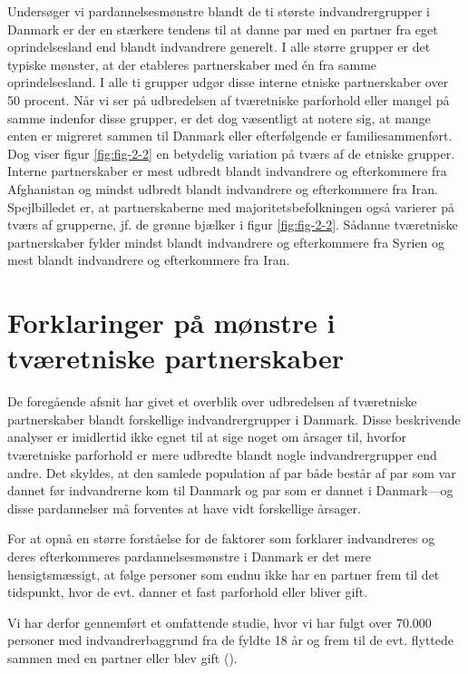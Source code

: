 \documentclass[
]{book}
\begin{document}
Undersøger vi pardannelsesmønstre blandt de ti største indvandrergrupper i Danmark er der en stærkere tendens til at danne par med en partner fra eget oprindelsesland end blandt indvandrere generelt. I alle større grupper er det typiske mønster, at der etableres partnerskaber med én fra samme oprindelsesland. I alle ti grupper udgør disse interne etniske partnerskaber over 50 procent. Når vi ser på udbredelsen af tværetniske parforhold eller mangel på samme indenfor disse grupper, er det dog væsentligt at notere sig, at mange enten er migreret sammen til Danmark eller efterfølgende er familiesammenført. Dog viser figur \ref{fig:fig-2-2} en betydelig variation på tværs af de etniske grupper. Interne partnerskaber er mest udbredt blandt indvandrere og efterkommere fra Afghanistan og mindst udbredt blandt indvandrere og efterkommere fra Iran. Spejlbilledet er, at partnerskaberne med majoritetsbefolkningen også varierer på tværs af grupperne, jf. de grønne bjælker i figur \ref{fig:fig-2-2}. Sådanne tværetniske partnerskaber fylder mindst blandt indvandrere og efterkommere fra Syrien og mest blandt indvandrere og efterkommere fra Iran.

\section{Forklaringer på mønstre i tværetniske partnerskaber}\label{forklaringer-puxe5-muxf8nstre-i-tvuxe6retniske-partnerskaber}

De foregående afsnit har givet et overblik over udbredelsen af tværetniske partnerskaber blandt forskellige indvandrergrupper i Danmark. Disse beskrivende analyser er imidlertid ikke egnet til at sige noget om årsager til, hvorfor tværetniske parforhold er mere udbredte blandt nogle indvandrergrupper end andre. Det skyldes, at den samlede population af par både består af par som var dannet før indvandrerne kom til Danmark og par som er dannet i Danmark---og disse pardannelser må forventes at have vidt forskellige årsager.

For at opnå en større forståelse for de faktorer som forklarer indvandreres og deres efterkommeres pardannelsesmønstre i Danmark er det mere hensigtsmæssigt, at følge personer som endnu ikke har en partner frem til det tidspunkt, hvor de evt. danner et fast parforhold eller bliver gift.

Vi har derfor gennemført et omfattende studie, hvor vi har fulgt over 70.000 personer med indvandrerbaggrund fra de fyldte 18 år og frem til de evt. flyttede sammen med en partner eller blev gift ().
\end{document}
